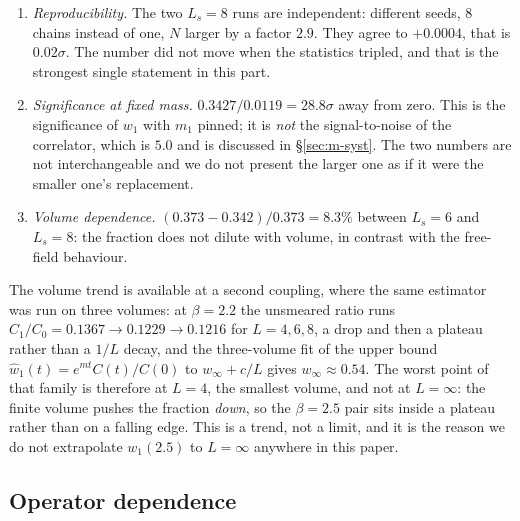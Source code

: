 \begin{enumerate}
\item \emph{Reproducibility.} The two $L_s=8$ runs are independent: different seeds, $8$ chains
  instead of one, $N$ larger by a factor $2.9$. They agree to $+0.0004$, that is $0.02\sigma$. The
  number did not move when the statistics tripled, and that is the strongest single statement in
  this part.
\item \emph{Significance at fixed mass.} $0.3427/0.0119=28.8\sigma$ away from zero. This is the
  significance of $w_1$ with $m_1$ pinned; it is \emph{not} the signal-to-noise of the correlator,
  which is $5.0$ and is discussed in \S\ref{sec:m-syst}. The two numbers are not interchangeable and
  we do not present the larger one as if it were the smaller one's replacement.
\item \emph{Volume dependence.} $(0.373-0.342)/0.373=8.3\%$ between $L_s=6$ and $L_s=8$: the
  fraction does not dilute with volume, in contrast with the free-field behaviour.
\end{enumerate}

The volume trend is available at a second coupling, where the same estimator was run on three
volumes: at $\beta=2.2$ the unsmeared ratio runs $C_1/C_0=0.1367\to0.1229\to0.1216$ for $L=4,6,8$,
a drop and then a plateau rather than a $1/L$ decay, and the three-volume fit of the upper bound
$\hat w_1(t)=e^{mt}C(t)/C(0)$ to $w_\infty+c/L$ gives $w_\infty\approx0.54$. The worst point of that
family is therefore at $L=4$, the smallest volume, and not at $L=\infty$: the finite volume pushes
the fraction \emph{down}, so the $\beta=2.5$ pair sits inside a plateau rather than on a falling
edge. This is a trend, not a limit, and it is the reason we do not extrapolate
$w_1(2.5)$ to $L=\infty$ anywhere in this paper.

\subsection{Operator dependence}
\label{sec:m-opdep}


